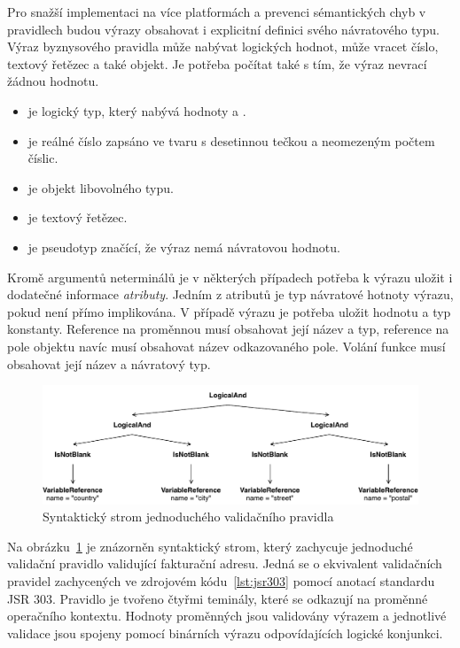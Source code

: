 Pro snažší implementaci na více platformách a prevenci sémantických chyb v pravidlech budou výrazy
obsahovat i explicitní definici svého návratového typu. Výraz byznysového pravidla může nabývat logických hodnot,
může vracet číslo, textový řetězec a také objekt. Je potřeba počítat také s tím, že výraz nevrací žádnou
hodnotu.

\begin{itemize}
    \item {} je logický typ, který nabývá hodnoty  a .
    \item {} je reálné číslo zapsáno ve tvaru s desetinnou tečkou a neomezeným počtem číslic.
    \item {} je objekt libovolného typu.
    \item {} je textový řetězec.
    \item {} je pseudotyp značící, že výraz nemá návratovou hodnotu.
\end{itemize}

Kromě argumentů neterminálů je v některých případech potřeba k výrazu uložit i dodatečné informace \textendash\xspace
\textit{atributy}. Jedním z atributů je typ návratové hotnoty výrazu, pokud není přímo implikována.
V případě výrazu  je potřeba uložit hodnotu a typ konstanty. Reference na proměnnou
musí obsahovat její název a typ, reference na pole objektu navíc musí obsahovat název odkazovaného pole.
Volání funkce musí obsahovat její název a návratový typ.

\begin{figure}
    \centering
    \includegraphics[keepaspectratio=true, width=1\linewidth]{figures/simple-rule.pdf}
    \caption{Syntaktický strom jednoduchého validačního pravidla}
    \label{fig:simple-rule}
\end{figure}

Na obrázku~\ref{fig:simple-rule} je znázorněn syntaktický strom, který zachycuje jednoduché
validační pravidlo validující fakturační adresu. Jedná se o ekvivalent validačních pravidel
zachycených ve zdrojovém kódu~\ref{lst:jsr303} pomocí anotací standardu \gls{JSR} 303.
Pravidlo je tvořeno čtyřmi teminály, které se odkazují na proměnné operačního kontextu.
Hodnoty proměnných jsou validovány výrazem  a jednotlivé validace
jsou spojeny pomocí binárních výrazu  odpovídajících logické konjunkci.

